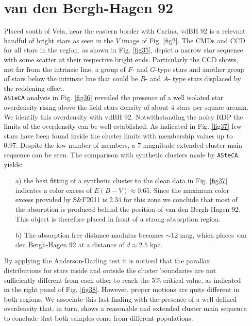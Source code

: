 \documentclass[draft]{aa}
\begin{document}
\section{van den Bergh-Hagen 92}

Placed south of Vela, near the eastern border with Carina, vdBH
92 is a relevant handful of bright stars as seen in the $V$ image of Fig.
\ref{fig2}. The CMDs and CCD for all stars in the region, as shown in Fig.
\ref{fig35}, depict a narrow star sequence with some scatter at their respective
bright ends. Particularly the CCD shows, not far from the intrinsic line, a
group of $F$- and $G$-type stars and another group of stars below the intrinsic
line that could be $B$- and $A$- type stars displaced by the reddening effect.\\

\texttt{ASteCA} analysis in Fig. \ref{fig36} revealed the presence of a well
isolated star overdensity rising above the field stars density of about 4
stars per square arcmin. We identify this overdensity with vdBH
92. Notwithstanding the noisy RDP the limits of the overdensity can be well
established. As indicated in Fig. \ref{fig37} few stars have been found inside
the cluster limits with membership values up to 0.97. Despite the low
number of members, a 7 magnitude extended cluster main sequence can be seen.
The comparison with synthetic clusters made by \texttt{ASteCA} yields:

\begin{itemize}
\item [a)] the best fitting of a synthetic cluster to the clean data in Fig. 
    \ref{fig37} indicates a color excess of $E(B-V)\approx0.65$. Since the
    maximum color excess provided by S\&F2011 is 2.34 for this zone we
    conclude that most of the absorption is produced behind the position of van
    den Bergh-Hagen 92. This object is therefore placed in front of a strong
    absorption region.
\item [b)] The absorption free distance modulus becomes $\sim$12 mag, which
    places van den Bergh-Hagen 92 at a distance of $d\approx2.5$ kpc.
\end{itemize}

By applying the Anderson-Darling test it is noticed that the parallax
distributions for stars inside and outside the cluster boundaries are not
sufficiently different from each other to reach the 5\% critical value, as
indicated in the right panel of Fig. \ref{fig38}. However, proper motions are
quite different in both regions. We associate this last finding with the
presence of a well defined overdensity that, in turn, shows a reasonable and
extended cluster main sequence to conclude that both samples come from
different populations.\\
\end{document}

